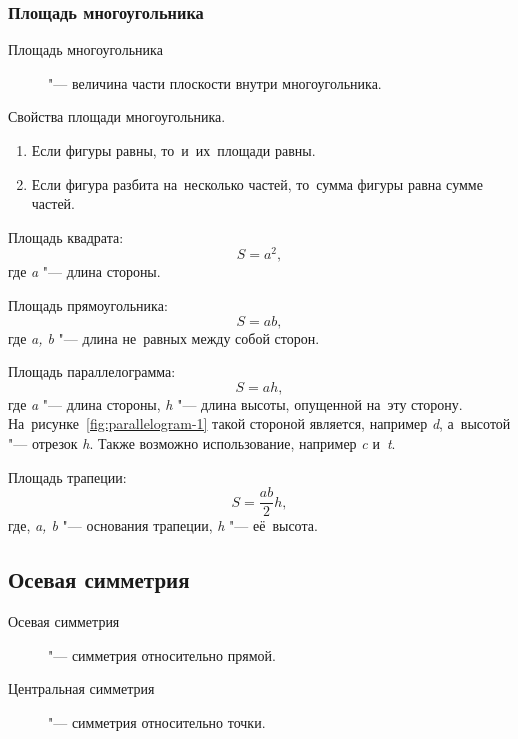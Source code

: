 \documentclass[]{scrartcl}
\begin{document}
\subsubsection{Площадь многоугольника}
\begin{description}
	\item[Площадь многоугольника] "--- величина части плоскости внутри многоугольника.
\end{description}
Свойства площади многоугольника.
\begin{enumerate}
	\item Если фигуры равны, то~и~их~площади равны.
	\item Если фигура разбита на~несколько частей, то~сумма фигуры равна сумме частей.
\end{enumerate}
Площадь квадрата:
\begin{equation}\label{eq:square-square}
S=a^2,
\end{equation}
где \textit{a} "--- длина стороны.

Площадь прямоугольника:
\begin{equation}\label{eq:rectangle-square}
S=ab,
\end{equation}
где \textit{a, b} "--- длина не~равных между собой сторон.

Площадь параллелограмма:
\begin{equation}\label{eq:parallelogram-square}
S=ah,
\end{equation}
где \textit{a} "--- длина стороны, \textit{h} "--- длина высоты, опущенной на~эту сторону. На~рисунке~\ref{fig:parallelogram-1} такой стороной является, например \textit{d}, а~высотой "--- отрезок \textit{h}. Также возможно использование, например \textit{c} и~\textit{t}.

Площадь трапеции:
\begin{equation}\label{eq:parallelogram-square}
S=\frac{ab}{2}h,
\end{equation}
где, \textit{a, b} "--- основания трапеции, \textit{h} "--- её~высота.


\subsection{Осевая симметрия}
\begin{description}
	\item[Осевая симметрия] "--- симметрия относительно прямой.
\end{description}

\begin{description}
	\item[Центральная симметрия] "--- симметрия относительно точки.
\end{description} 
\end{document}

